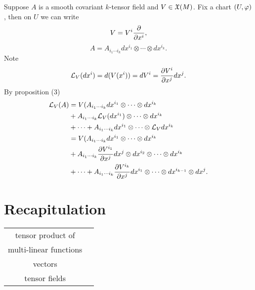 \begin{example}
    Suppose $A$ is a smooth covariant $k$-tensor field and $V \in \frak{X}(M)$. Fix a chart $(U,\varphi)$, then on $U$ we can write
    $$V = V^i\pdv{}{x^i}, $$
    $$A = A_{i_1\cdots i_k}dx^{i_1} \otimes \cdots \otimes dx^{i_k}. $$ 
    Note $$\mathcal{L}_V(dx^i) = d(V(x^i)) = dV^i
    = \pdv{V^i}{x^j}dx^j. $$ By proposition (3)
    \begin{align*}
    \mathcal{L}_V(A) &= 
    V(A_{i_1\cdots i_k} dx^{i_1} \otimes \cdots \otimes dx^{i_k} \\ 
    &+ A_{i_1\cdots i_k}\mathcal{L}_V(dx^{i_1}) \otimes \cdots \otimes dx^{i_k} \\ 
    &+ \cdots +  
    A_{i_1\cdots i_k}dx^{i_1} \otimes \cdots \otimes \mathcal{L}_V{dx^{i_k}} \\
    &= V(A_{i_1\cdots i_k}dx^{i_1} \otimes \cdots \otimes dx^{i_k} \\
    &+ A_{i_1\cdots i_k}\pdv{V^{i_1}}{x^j} dx^{j} \otimes dx^{i_2} \otimes \cdots \otimes dx^{i_k} \\ &+ \cdots + 
    A_{i_1\cdots i_k}\pdv{V^{i_k}}{x^j} dx^{i_1} \otimes \cdots \otimes dx^{i_{k-1}} \otimes dx^j.
    \end{align*}
\end{example}

\section{Recapitulation}
\begin{tabular}{c|c}
    tensor product of &  \\
    multi-linear functions & \\
    vectors & \\
    tensor fields & \\
\end{tabular}